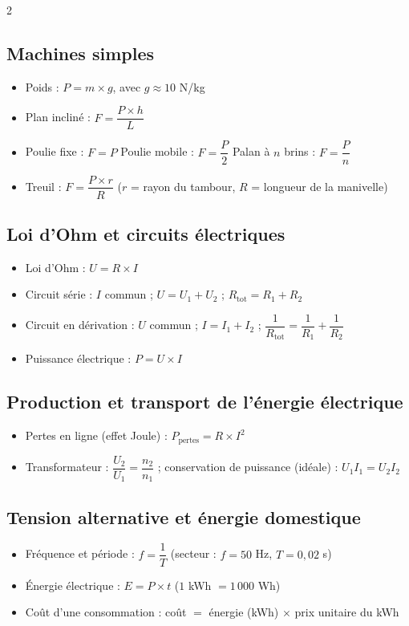 \begin{multicols}{2}
\subsection*{\color{onbo}Machines simples}
\begin{itemize}
\item Poids : $P=m\times g$, avec $g\approx10$ N/kg
\item Plan incliné : $F=\dfrac{P\times h}{L}$
\item Poulie fixe : $F=P$ \quad Poulie mobile : $F=\dfrac P2$ \quad Palan à $n$ brins :
$F=\dfrac Pn$
\item Treuil : $F=\dfrac{P\times r}{R}$ ($r$ = rayon du tambour, $R$ = longueur de la
manivelle)
\end{itemize}

\subsection*{\color{onbo}Loi d'Ohm et circuits électriques}
\begin{itemize}
\item Loi d'Ohm : $U=R\times I$
\item Circuit série : $I$ commun ; $U=U_1+U_2$ ; $R_{\text{tot}}=R_1+R_2$
\item Circuit en dérivation : $U$ commun ; $I=I_1+I_2$ ;
$\dfrac1{R_{\text{tot}}}=\dfrac1{R_1}+\dfrac1{R_2}$
\item Puissance électrique : $P=U\times I$
\end{itemize}

\subsection*{\color{onbo}Production et transport de l'énergie électrique}
\begin{itemize}
\item Pertes en ligne (effet Joule) : $P_{\text{pertes}}=R\times I^2$
\item Transformateur : $\dfrac{U_2}{U_1}=\dfrac{n_2}{n_1}$ ; conservation de puissance
(idéale) : $U_1I_1=U_2I_2$
\end{itemize}

\subsection*{\color{onbo}Tension alternative et énergie domestique}
\begin{itemize}
\item Fréquence et période : $f=\dfrac1T$ (secteur : $f=50$ Hz, $T=0{,}02$ s)
\item Énergie électrique : $E=P\times t$ ($1$ kWh $=1\,000$ Wh)
\item Coût d'une consommation : coût $=$ énergie (kWh) $\times$ prix unitaire du kWh
\end{itemize}


\end{multicols}
